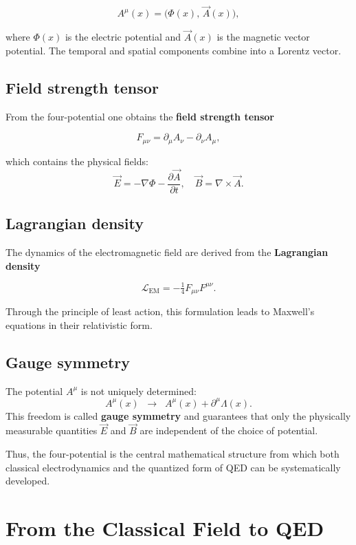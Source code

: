 \[
A^\mu(x) = \big( \Phi(x), \, \vec{A}(x) \big) ,
\]

where \( \Phi(x) \) is the electric potential and \( \vec{A}(x) \) is the magnetic vector potential. 
The temporal and spatial components combine into a Lorentz vector.

\subsection*{Field strength tensor}
From the four-potential one obtains the \textbf{field strength tensor}

\[
F_{\mu\nu} = \partial_\mu A_\nu - \partial_\nu A_\mu ,
\]

which contains the physical fields:
\[
\vec{E} = -\nabla \Phi - \frac{\partial \vec{A}}{\partial t}, 
\quad
\vec{B} = \nabla \times \vec{A}.
\]

\subsection*{Lagrangian density}
The dynamics of the electromagnetic field are derived from the
\textbf{Lagrangian density}

\[
\mathcal{L}_{\text{EM}} = - \tfrac{1}{4} F_{\mu\nu} F^{\mu\nu} .
\]

Through the principle of least action, this formulation leads to 
Maxwell’s equations in their relativistic form.

\subsection*{Gauge symmetry}
The potential \( A^\mu \) is not uniquely determined:
\[
A^\mu(x) \;\;\rightarrow\;\; A^\mu(x) + \partial^\mu \Lambda(x).
\]
This freedom is called \textbf{gauge symmetry} and guarantees that only
the physically measurable quantities \( \vec{E} \) and \( \vec{B} \)
are independent of the choice of potential.

\medskip
Thus, the four-potential is the central mathematical structure from which
both classical electrodynamics and the quantized form of QED
can be systematically developed.

\section{From the Classical Field to QED}
\label{anhangA:feld_zu_qed}

